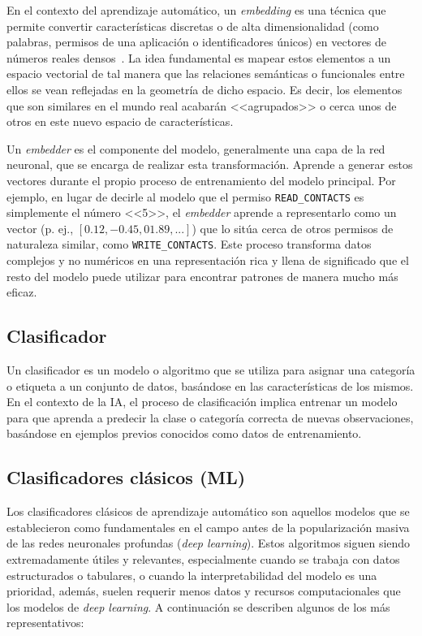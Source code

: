 En el contexto del aprendizaje automático, un \textit{embedding} es una técnica que permite convertir características discretas o de alta dimensionalidad (como palabras, permisos de una aplicación o identificadores únicos) en vectores de números reales densos~\cite{bengio2003neural}. La idea fundamental es mapear estos elementos a un espacio vectorial de tal manera que las relaciones semánticas o funcionales entre ellos se vean reflejadas en la geometría de dicho espacio. Es decir, los elementos que son similares en el mundo real acabarán <<agrupados>> o cerca unos de otros en este nuevo espacio de características.

Un \textit{embedder} es el componente del modelo, generalmente una capa de la red neuronal, que se encarga de realizar esta transformación. Aprende a generar estos vectores durante el propio proceso de entrenamiento del modelo principal. Por ejemplo, en lugar de decirle al modelo que el permiso \texttt{READ\_CONTACTS} es simplemente el número <<5>>, el \textit{embedder} aprende a representarlo como un vector (p. ej., $[0.12, -0.45, 01.89, ...]$) que lo sitúa cerca de otros permisos de naturaleza similar, como \texttt{WRITE\_CONTACTS}. Este proceso transforma datos complejos y no numéricos en una representación rica y llena de significado que el resto del modelo puede utilizar para encontrar patrones de manera mucho más eficaz.

\subsection{Clasificador}

Un clasificador es un modelo o algoritmo que se utiliza para asignar una categoría o etiqueta a un conjunto de datos, basándose en las características de los mismos. En el contexto de la IA, el proceso de clasificación implica entrenar un modelo para que aprenda a predecir la clase o categoría correcta de nuevas observaciones, basándose en ejemplos previos conocidos como datos de entrenamiento.

\subsection{Clasificadores clásicos (ML)}

Los clasificadores clásicos de aprendizaje automático son aquellos modelos que se establecieron como fundamentales en el campo antes de la popularización masiva de las redes neuronales profundas (\textit{deep learning}). Estos algoritmos siguen siendo extremadamente útiles y relevantes, especialmente cuando se trabaja con datos estructurados o tabulares, o cuando la interpretabilidad del modelo es una prioridad, además, suelen requerir menos datos y recursos computacionales que los modelos de \textit{deep learning}. A continuación se describen algunos de los más representativos:

